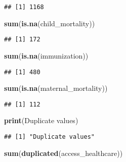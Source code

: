 \documentclass[
]{article}
\newenvironment{Shaded}{\begin{snugshade}}{\end{snugshade}}
\newcommand{\FunctionTok}[1]{\textcolor[rgb]{0.13,0.29,0.53}{\textbf{#1}}}
\newcommand{\NormalTok}[1]{#1}
\newcommand{\StringTok}[1]{\textcolor[rgb]{0.31,0.60,0.02}{#1}}
\begin{document}
\begin{verbatim}
## [1] 1168
\end{verbatim}

\begin{Shaded}
\begin{Highlighting}[]
\FunctionTok{sum}\NormalTok{(}\FunctionTok{is.na}\NormalTok{(child\_mortality))}
\end{Highlighting}
\end{Shaded}

\begin{verbatim}
## [1] 172
\end{verbatim}

\begin{Shaded}
\begin{Highlighting}[]
\FunctionTok{sum}\NormalTok{(}\FunctionTok{is.na}\NormalTok{(immunization))}
\end{Highlighting}
\end{Shaded}

\begin{verbatim}
## [1] 480
\end{verbatim}

\begin{Shaded}
\begin{Highlighting}[]
\FunctionTok{sum}\NormalTok{(}\FunctionTok{is.na}\NormalTok{(maternal\_mortality))}
\end{Highlighting}
\end{Shaded}

\begin{verbatim}
## [1] 112
\end{verbatim}

\begin{Shaded}
\begin{Highlighting}[]
\FunctionTok{print}\NormalTok{(}\StringTok{\textquotesingle{}Duplicate values\textquotesingle{}}\NormalTok{)}
\end{Highlighting}
\end{Shaded}

\begin{verbatim}
## [1] "Duplicate values"
\end{verbatim}

\begin{Shaded}
\begin{Highlighting}[]
\FunctionTok{sum}\NormalTok{(}\FunctionTok{duplicated}\NormalTok{(access\_healthcare))}
\end{Highlighting}
\end{Shaded}
\end{document}
